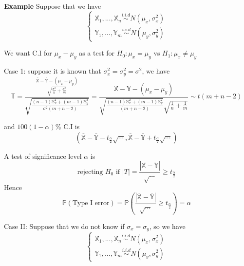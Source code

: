 \textbf{Example} Suppose that we have
$$\begin{cases}
\mathbb{X}_1, ..., \mathbb{X}_n \overset{i.i.d}{\sim} N(\mu_x, \sigma_x^2) \\
\mathbb{Y}_1, ..., \mathbb{Y}_m \overset {i.i.d}{\sim} N(\mu_y, \sigma_y^2)
\end{cases}$$

We want C.I for $\mu_x - \mu_y$ as a test for $H_0: \mu_x = \mu_y$ vs $H_1:\mu_x\neq\mu_y$

Case 1: suppose it is known that $\sigma_x^2 = \sigma_y^2 = \sigma^2$, we have
$$\mathbb{T} = \frac{\frac{\bar{\mathbb{X}} - \bar{\mathbb{Y}} - (\mu_x-\mu_y)}{\sqrt{\frac{\sigma^2}{n} + \frac{\sigma^2}{m}}}}{\sqrt{\frac{(n-1)\mathbb{S}_x^2 + (m-1)\mathbb{S}_y^2}{\sigma^2 (m+n-2)}}} = \frac{\bar{\mathbb{X}} - \bar{\mathbb{Y}} - (\mu_x-\mu_y)}{\sqrt{\frac{(n-1)\mathbb{S}_x^2 + (m-1)\mathbb{S}_y^2}{(m+n-2)}} \sqrt{\frac{1}{n} + \frac{1}{m}}} \sim t(m+n-2)$$

and $100(1-\alpha)\%$ C.I is
$$(\bar{\mathbb{X}} - \bar{\mathbb{Y}} - t_{\frac{\alpha}{2}} \sqrt{\cdots}, \bar{\mathbb{X}} - \bar{\mathbb{Y}} + t_{\frac{\alpha}{2}} \sqrt{\cdots})$$

A test of significance level $\alpha$ is
$$\text{rejecting } H_0 \text{ if } |T| = \frac{|\bar{\mathbb{X}} - \bar{\mathbb{Y}}|}{\sqrt{\cdots}} \geq t_{\frac{\alpha}{2}} $$
Hence 
$$\mathbb{P}(\text{Type I error}) = \mathbb{P}( \frac{|\bar{\mathbb{X}} - \bar{\mathbb{Y}}|}{\sqrt{\cdots}} \geq t_{\frac{\alpha}{2}} ) = \alpha$$

Case II: Suppose that we do not know if $\sigma_x = \sigma_y$, so we have
$$\begin{cases}
\mathbb{X}_1, ..., \mathbb{X}_n \overset{i.i.d}{\sim} N(\mu_x, \sigma_x^2) \\
\mathbb{Y}_1, ..., \mathbb{Y}_m \overset {i.i.d}{\sim} N(\mu_y, \sigma_y^2)
\end{cases}$$

